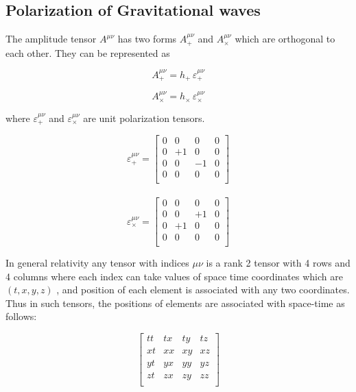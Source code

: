 \subsection{Polarization of Gravitational waves}

The amplitude tensor $A^{\mu\nu}$ has two forms $A^{\mu\nu}_{+}$ and $A^{\mu\nu}_{\times}$ which are orthogonal to each other. They can be represented as 

\begin{equation}
    A^{\mu\nu}_{+} = h_{+}\, \varepsilon^{\mu\nu}_{+}
\end{equation}

\begin{equation}
    A^{\mu\nu}_{\times} = h_{\times} \,\varepsilon^{\mu\nu}_{\times}
\end{equation}

where $\varepsilon^{\mu\nu}_{+}$ and $\varepsilon^{\mu\nu}_{\times}$ are unit polarization tensors.

\begin{equation}
\varepsilon^{\mu\nu}_{+} =
\begin{bmatrix}
0 & 0 & 0 & 0 \\
0 & +1 & 0 & 0 \\
0 & 0 & -1 & 0 \\
0 & 0 & 0 & 0 \\
\end{bmatrix}
\end{equation}
\\
\begin{equation}
\varepsilon^{\mu\nu}_{\times} =
\begin{bmatrix}
0 & 0 & 0 & 0 \\
0 & 0 & +1 & 0 \\
0 & +1 & 0 & 0 \\
0 & 0 & 0 & 0 \\
\end{bmatrix}
\end{equation}

\noindent In general relativity any tensor with indices $\mu\nu$ is a rank 2 tensor with 4 rows and 4 columns where each index can take values of space time coordinates which are $(t,x,y,z)$ , and position of each element is associated with any two coordinates. Thus in such tensors, the positions of elements are associated with space-time as follows:

\begin{equation*}
    \begin{bmatrix}
    tt & tx & ty & tz \\
    xt & xx & xy & xz \\
    yt & yx & yy & yz \\
    zt & zx & zy & zz \\
    \end{bmatrix}
\end{equation*}

